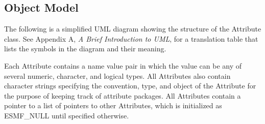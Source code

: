 %

\subsection{Object Model}

The following is a simplified UML diagram showing the structure of the
Attribute class.  See Appendix A, {\it A Brief Introduction to UML},
for a translation table that lists the symbols in the diagram and their 
meaning.


Each Attribute contains a name value pair in which the value can be any of several numeric, character, and logical types.  All Attributes also contain character strings specifying the convention, type, and object of the Attribute for the purpose of keeping track of attribute packages.  All Attributes contain a pointer to a list of pointers to other Attributes, which is initialized as ESMF_NULL until specified otherwise.

